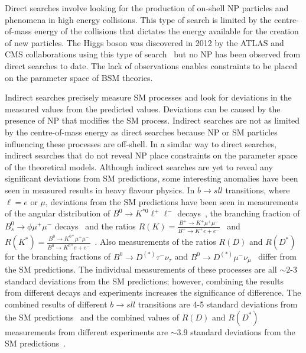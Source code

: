 Direct searches involve looking for the production of on-shell NP particles and phenomena in high energy collisions. 
This type of search is limited by the centre-of-mass energy of the collisions that dictates the energy available for the creation of new particles. 
The Higgs boson was discovered in 2012 by the ATLAS and CMS collaborations using this type of search~\cite{Chatrchyan:2012xdj,Aad:2012tfa} but no NP has been observed from direct searches to date. The lack of observations enables constraints to be placed on the parameter space of BSM theories.


Indirect searches precisely measure SM processes and look for deviations in the measured values from the predicted values. Deviations can be caused by the presence of NP that modifies the SM process. 
Indirect searches are not as limited by the centre-of-mass energy as direct searches because NP or SM particles influencing these processes are off-shell. %
In a similar way to direct searches, indirect searches that do not reveal NP place constraints on the parameter space of the theoretical models. Although indirect searches are yet to reveal any significant deviations from SM predictions, some interesting anomalies have been seen in measured results in heavy flavour physics. 
In $b \to sll$ transitions, where $\ell = e$ or $ \mu$,  deviations from the SM predictions have been seen in measurements of the angular distribution of $B^0 \to K^{*0} \ell^{+} \ell^{-}$ decays~\cite{PhysRevLett.118.111801,Aaij:2014pli, Aaij:2015oid, ATLAS-CONF-2017-023,CMS-PAS-BPH-15-008}, the branching fraction of $B^{0}_{s} \to \phi  \mu^{+} \mu^{-}$ decays~\cite{Aaij:2015esa} and the ratios $R(K) = \frac{B^+ \to K^+ \mu^{+} \mu^{-}}{B^+ \to K^+ e{+} e^{-}}$~\cite{PhysRevLett.113.151601} and $R(K^{*}) = \frac{B^0 \to K^{0*} \mu^{+} \mu^{-}}{B^0 \to K^{0*} e{+} e^{-}}$~\cite{Aaij:2017vbb}. Also measurements of the ratios $R(D)$ and $R(D^*)$ for the branching fractions of $B^0 \to D^{(*)} \tau^{-} \nu_{\tau}$ and $B^0 \to D^{(*)} \mu^{-} \nu_{\mu}$~\cite{Aaij:2015yra,Huschle:2015rga, Lees:2012xj,Lees:2013uzd, Sato:2016svk} differ from the SM predictions. 
The individual measurements of these processes are all $\sim2$-3 standard deviations from the SM predictions; however, combining the results from different decays and experiments increases the significance of difference. The combined results of different $b \to sll$ transitions are 4-5 standard deviations from the SM predictions~\cite{Altmannshofer:2017yso,Capdevila:2017bsm} and the combined values of $R(D)$ and $R(D^*)$ measurements from different experiments are $\sim 3.9$ standard deviations from the SM predictions~\cite{Amhis:2016xyh}.  



